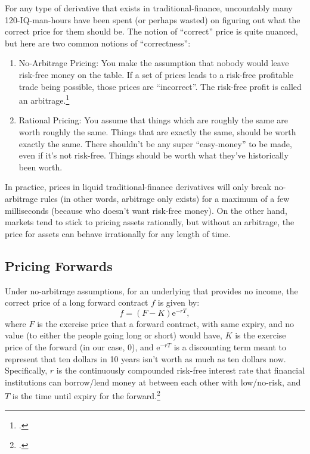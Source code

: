 \documentclass{article}
\begin{document}
	For any type of derivative that exists in traditional-finance, uncountably many 120-IQ-man-hours have been spent (or perhaps wasted) on figuring out what the correct price for them should be. The notion of ``correct'' price is quite nuanced, but here are two common notions of ``correctness'':
	\begin{enumerate}
		\item No-Arbitrage Pricing: You make the assumption that nobody would leave risk-free money on the table. If a set of prices leads to a risk-free profitable trade being possible, those prices are ``incorrect''. The risk-free profit is called an arbitrage.\footcite[126]{hull}
		\item Rational Pricing: You assume that things which are roughly the same are worth roughly the same. Things that are exactly the same, should be worth exactly the same. There shouldn't be any super ``easy-money'' to be made, even if it's not risk-free. Things should be worth what they've historically been worth.
	\end{enumerate}
	In practice, prices in liquid traditional-finance derivatives will only break no-arbitrage rules (in other words, arbitrage only exists) for a maximum of a few milliseconds (because who doesn't want risk-free money). On the other hand, markets tend to stick to pricing assets rationally, but without an arbitrage, the price for assets can behave irrationally for any length of time.
	\subsection{Pricing Forwards}
	Under no-arbitrage assumptions, for an underlying that provides no income, the correct price of a long forward contract $f$ is given by:
	\begin{equation}
		\label{forward-val}
		f = (F - K)\mathrm{e}^{-rT},
	\end{equation}
	where $F$ is the exercise price that a forward contract, with same expiry, and no value (to either the people going long or short) would have, $K$ is the exercise price of the forward (in our case, 0), and $\mathrm{e}^{-rT}$ is a discounting term meant to represent that ten dollars in 10 years isn't worth as much as ten dollars now. Specifically, $r$ is the continuously compounded risk-free interest rate that financial institutions can borrow/lend money at between each other with low/no-risk, and $T$ is the time until expiry for the forward.\footcite[133]{hull}
	
\end{document}

